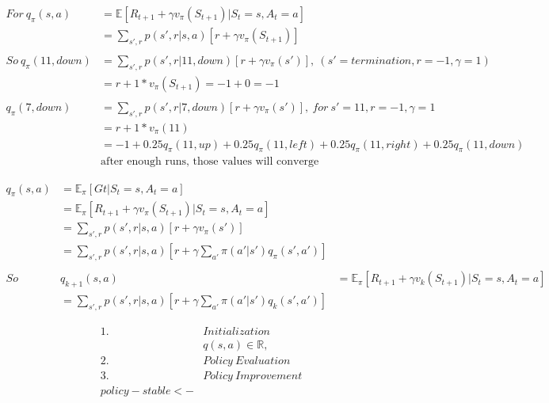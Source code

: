 \documentclass{article}
\begin{document}

\[
  \begin{aligned}
    For \ q_{\pi}(s,a) &= \mathbb{E}[R_{t+1} + \gamma v_{\pi}(S_{t+1}) | S_{t}=s, A_{t}=a]\\
    &= \sum_{s',r}p(s',r|s,a)[r + \gamma v_{\pi}(S_{t+1})]\\
    \\
    So \ q_{\pi}(11,down) &= \sum_{s',r}p(s',r|11,down)[r + \gamma v_{\pi}(s')], \ (s'=termination, r=-1, \gamma = 1) \\
    &= r + 1*v_{\pi}(S_{t+1}) = -1 + 0 = -1 \\
    \\
    q_{\pi}(7,down) &= \sum_{s',r}p(s',r|7,down)[r + \gamma v_{\pi}(s')], \  for \  s'=11, r=-1, \gamma = 1\\
    &= r + 1*v_{\pi}(11) \\
    &= -1 + 0.25q_{\pi}(11,up) + 0.25q_{\pi}(11,left) + 0.25q_{\pi}(11,right) + 0.25q_{\pi}(11,down)\\
    &\text{after enough runs, those values will converge}
  \end{aligned}
\]

\[
  \begin{aligned}
    q_{\pi}(s,a) &= \mathbb{E}_{\pi}[ Gt | S_{t}=s, A_{t}=a]\\
    &= \mathbb{E}_{\pi}[R_{t+1} + \gamma v_{\pi}(S_{t+1}) | S_{t}=s, A_{t}=a]\\
    &= \sum_{s',r}p(s',r|s,a)[r + \gamma v_{\pi}(s')]\\
    &= \sum_{s',r}p(s',r|s,a)[r + \gamma \sum_{a'}\pi(a'|s')q_{\pi}(s',a')]\\
    \\So \ \ &
    q_{k+1}(s, a) &= \mathbb{E}_{\pi}[R_{t+1} + \gamma v_{k}(S_{t+1}) | S_{t}=s, A_{t}=a]\\
    &= \sum_{s',r}p(s',r|s,a)[r + \gamma \sum_{a'}\pi(a'|s')q_{k}(s',a')]
  \end{aligned}
\]

\[
  \begin{aligned}
    1. \ & Initialization\\
    & q(s, a) \in \mathbb{R}, \\
    2. \ & Policy \ Evaluation\\
    3. \ & Policy \ Improvement\\
    policy-stable <-
  \end{aligned}
\]
\end{document}
